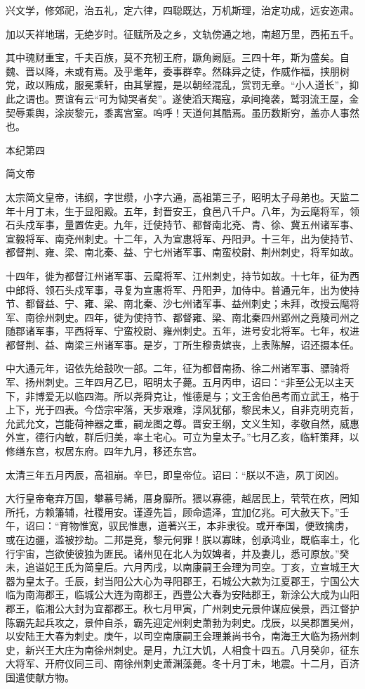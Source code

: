 \documentclass[12pt,UTF8]{ctexbook}
\begin{document}
兴文学，修郊祀，治五礼，定六律，四聪既达，万机斯理，治定功成，远安迩肃。

加以天祥地瑞，无绝岁时。征赋所及之乡，文轨傍通之地，南超万里，西拓五千。

其中瑰财重宝，千夫百族，莫不充牣王府，蹶角阙庭。三四十年，斯为盛矣。自魏、晋以降，未或有焉。及乎耄年，委事群幸。然硃异之徒，作威作福，挟朋树党，政以贿成，服冕乘轩，由其掌握，是以朝经混乱，赏罚无章。“小人道长”，抑此之谓也。贾谊有云“可为恸哭者矣”。遂使滔天羯寇，承间掩袭，鹫羽流王屋，金契辱乘舆，涂炭黎元，黍离宫室。呜呼！天道何其酷焉。虽历数斯穷，盖亦人事然也。





本纪第四

简文帝

太宗简文皇帝，讳纲，字世缵，小字六通，高祖第三子，昭明太子母弟也。天监二年十月丁未，生于显阳殿。五年，封晋安王，食邑八千户。八年，为云麾将军，领石头戍军事，量置佐吏。九年，迁使持节、都督南北兗、青、徐、冀五州诸军事、宣毅将军、南兗州刺史。十二年，入为宣惠将军、丹阳尹。十三年，出为使持节、都督荆、雍、梁、南北秦、益、宁七州诸军事、南蛮校尉、荆州刺史，将军如故。

十四年，徙为都督江州诸军事、云麾将军、江州刺史，持节如故。十七年，征为西中郎将、领石头戍军事，寻复为宣惠将军、丹阳尹，加侍中。普通元年，出为使持节、都督益、宁、雍、梁、南北秦、沙七州诸军事、益州刺史；未拜，改授云麾将军、南徐州刺史。四年，徙为使持节、都督雍、梁、南北秦四州郢州之竟陵司州之随郡诸军事，平西将军、宁蛮校尉、雍州刺史。五年，进号安北将军。七年，权进都督荆、益、南梁三州诸军事。是岁，丁所生穆贵嫔丧，上表陈解，诏还摄本任。

中大通元年，诏依先给鼓吹一部。二年，征为都督南扬、徐二州诸军事、骠骑将军、扬州刺史。三年四月乙巳，昭明太子薨。五月丙申，诏曰：“非至公无以主天下，非博爱无以临四海。所以尧舜克让，惟德是与；文王舍伯邑考而立武王，格于上下，光于四表。今岱宗牢落，天步艰难，淳风犹郁，黎民未乂，自非克明克哲，允武允文，岂能荷神器之重，嗣龙图之尊。晋安王纲，文义生知，孝敬自然，威惠外宣，德行内敏，群后归美，率土宅心。可立为皇太子。”七月乙亥，临轩策拜，以修缮东宫，权居东府。四年九月，移还东宫。

太清三年五月丙辰，高祖崩。辛巳，即皇帝位。诏曰：“朕以不造，夙丁闵凶。

大行皇帝奄弃万国，攀慕号絺，厝身靡所。猥以寡德，越居民上，茕茕在疚，罔知所托，方赖籓辅，社稷用安。谨遵先旨，顾命遗泽，宜加亿兆。可大赦天下。”壬午，诏曰：“育物惟宽，驭民惟惠，道著兴王，本非隶役。或开奉国，便致擒虏，或在边疆，滥被抄劫。二邦是竞，黎元何罪！朕以寡昧，创承鸿业，既临率土，化行宇宙，岂欲使彼独为匪民。诸州见在北人为奴婢者，并及妻儿，悉可原放。”癸未，追谥妃王氏为简皇后。六月丙戌，以南康嗣王会理为司空。丁亥，立宣城王大器为皇太子。壬辰，封当阳公大心为寻阳郡王，石城公大款为江夏郡王，宁国公大临为南海郡王，临城公大连为南郡王，西豊公大春为安陆郡王，新涂公大成为山阳郡王，临湘公大封为宜都郡王。秋七月甲寅，广州刺史元景仲谋应侯景，西江督护陈霸先起兵攻之，景仲自杀，霸先迎定州刺史萧勃为刺史。戊辰，以吴郡置吴州，以安陆王大春为刺史。庚午，以司空南康嗣王会理兼尚书令，南海王大临为扬州刺史，新兴王大庄为南徐州刺史。是月，九江大饥，人相食十四五。八月癸卯，征东大将军、开府仪同三司、南徐州刺史萧渊藻薨。冬十月丁未，地震。十二月，百济国遣使献方物。
\end{document}
